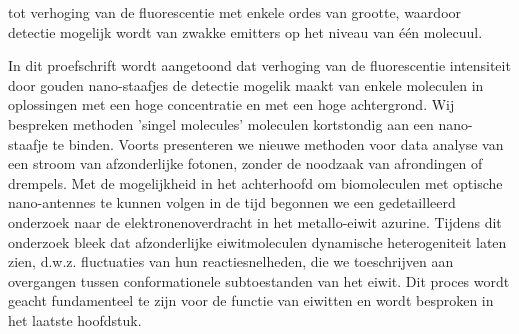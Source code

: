 tot verhoging van de fluorescentie met enkele ordes van grootte, waardoor detectie mogelijk wordt van zwakke emitters op het niveau van één molecuul. 


In dit proefschrift wordt aangetoond dat verhoging van de fluorescentie intensiteit door gouden nano-staafjes de detectie mogelik maakt van enkele moleculen in oplossingen met een hoge concentratie en met een hoge achtergrond. Wij bespreken methoden ’singel molecules’  moleculen kortstondig aan een nano-staafje te binden. Voorts presenteren we nieuwe methoden voor data analyse van een stroom van afzonderlijke fotonen, zonder de noodzaak van afrondingen of drempels. Met de mogelijkheid in het achterhoofd om biomoleculen met optische nano-antennes te kunnen volgen in de tijd begonnen we een gedetailleerd onderzoek naar de elektronenoverdracht in het metallo-eiwit azurine. Tijdens dit onderzoek bleek dat afzonderlijke eiwitmoleculen dynamische heterogeniteit laten zien, d.w.z. fluctuaties van hun reactiesnelheden, die we toeschrijven aan overgangen tussen conformationele subtoestanden van het eiwit. Dit proces wordt geacht fundamenteel te zijn voor de functie van eiwitten en wordt besproken in het laatste hoofdstuk.



